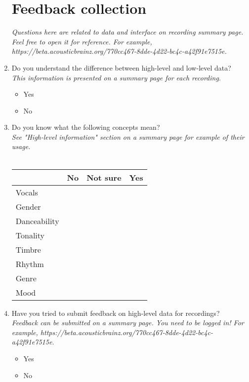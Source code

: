 \begin{enumerate}
    \section*{Feedback collection}
    \textit{Questions here are related to data and interface on recording summary page. Feel free to open it for reference. For example, https://beta.acousticbrainz.org/770cc467-8dde-4d22-bc4c-a42f91e7515e.}

    \item Do you understand the difference between high-level and low-level data? \\
    \textit{This information is presented on a summary page for each recording.} \\
    \begin{itemize}[label=$\circ$]
        \item Yes
        \item No
    \end{itemize}
    
    
    \item Do you know what the following concepts mean? \\
    \textit{See "High-level information" section on a summary page for example of their usage.} \\
    \\
    {\footnotesize
    \begin{tabularx}{\textwidth}{ X | c | c | c }
        & No & Not sure & Yes \\
        \hline Vocals & & & \\
        \hline Gender & & & \\
        \hline Danceability & & & \\
        \hline Tonality & & & \\
        \hline Timbre & & & \\
        \hline Rhythm & & & \\
        \hline Genre & & & \\
        \hline Mood & & & \\
    \end{tabularx}
    }

    \item Have you tried to submit feedback on high-level data for recordings? \\
    \textit{Feedback can be submitted on a summary page. You need to be logged in! For example, https://beta.acousticbrainz.org/770cc467-8dde-4d22-bc4c-a42f91e7515e.} \\
    \begin{itemize}[label=$\circ$]
        \item Yes
        \item No
    \end{itemize}
    

\end{enumerate}
